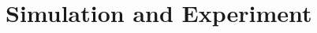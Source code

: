\documentclass[pdflatex,sn-mathphys-num]{sn-jnl}%
\theoremstyle{thmstyleone}%
\theoremstyle{thmstyletwo}%
\theoremstyle{thmstylethree}%
\begin{document}



	



\section{Simulation and Experiment}
\end{document}
